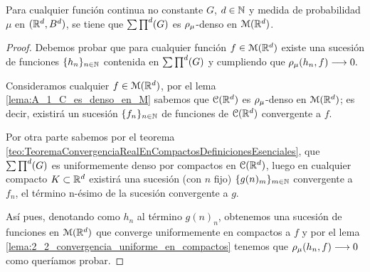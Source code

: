 %

\begin{teorema}\label{teo:2_2_denso_función_continua}
    Para cualquier función continua no constante $G$, $d \in \mathbb{N}$ y
    medida de probabilidad $\mu$ en $(\mathbb{R}^d, B^d)$, 
    se tiene que $\sum \prod^d (G)$ es $\rho_{\mu}$-denso en $\mathcal{M}(\mathbb{R}^d)$. 
\end{teorema} 
\begin{proof}
    Debemos probar que para cualquier función $f \in \mathcal{M}(\mathbb{R}^d)$ existe una 
    sucesión de funciones $\{h_n\}_{n\in \mathbb{N}}$ contenida en $\sum \prod^d (G)$ y 
    cumpliendo que $\rho_{\mu}(h_n, f) \longrightarrow 0.$

    Consideramos cualquier $f \in \mathcal{M}(\mathbb{R}^d)$,
    por el lema \ref{lema:A_1_C_es_denso_en_M} sabemos que $\mathcal{C}(\mathbb{R}^d)$ es $\rho_{\mu}$-denso en $\mathcal{M}(\mathbb{R}^d)$; 
    es decir, existirá un sucesión $\{f_n\}_{n\in \mathbb{N}}$ de funciones de $\mathcal{C}(\mathbb{R}^d)$ convergente a 
    $f$.  
    
    Por otra parte sabemos por el teorema \ref{teo:TeoremaConvergenciaRealEnCompactosDefinicionesEsenciales}, 
    que $\sum \prod^d (G)$ es uniformemente denso por compactos en $\mathcal{C}(\mathbb{R}^d)$, luego en cualquier compacto 
    $K \subset \mathbb{R}^d$ existirá una sucesión (con $n$ fijo) $\{g(n)_m \} _{m \in \mathbb{N}}$ convergente 
    a $f_n$, el término n-ésimo de la sucesión convergente a $g$. 

    Así pues, denotando como $h_n$ al término $g(n)_n$, obtenemos una sucesión de funciones 
    en $\mathcal{M}(\mathbb{R}^d)$ que converge uniformemente en compactos a $f$ y por el lema \ref{lema:2_2_convergencia_uniforme_en_compactos}
    tenemos que $\rho_{\mu}(h_n, f) \longrightarrow 0$ como queríamos probar.     
\end{proof}

